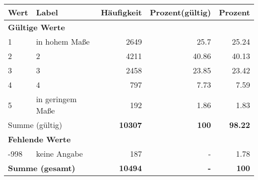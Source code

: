      \begin{longtable}{lXrrr}
     \toprule
     \textbf{Wert} & \textbf{Label} & \textbf{Häufigkeit} & \textbf{Prozent(gültig)} & \textbf{Prozent} \\
     \endhead
     \midrule
     \multicolumn{5}{l}{\textbf{Gültige Werte}}\\

     1 &
     \multicolumn{1}{X}{ in hohem Maße   } &


       \num{2649} &
       \num[round-mode=places,round-precision=2]{25,7} &
         \num[round-mode=places,round-precision=2]{25,24} \\

     2 &
     \multicolumn{1}{X}{ 2   } &


       \num{4211} &
       \num[round-mode=places,round-precision=2]{40,86} &
         \num[round-mode=places,round-precision=2]{40,13} \\

     3 &
     \multicolumn{1}{X}{ 3   } &


       \num{2458} &
       \num[round-mode=places,round-precision=2]{23,85} &
         \num[round-mode=places,round-precision=2]{23,42} \\

     4 &
     \multicolumn{1}{X}{ 4   } &


       \num{797} &
       \num[round-mode=places,round-precision=2]{7,73} &
         \num[round-mode=places,round-precision=2]{7,59} \\

     5 &
     \multicolumn{1}{X}{ in geringem Maße   } &


       \num{192} &
       \num[round-mode=places,round-precision=2]{1,86} &
         \num[round-mode=places,round-precision=2]{1,83} \\
     \midrule
     \multicolumn{2}{l}{Summe (gültig)} &
       \textbf{\num{10307}} &
     \textbf{100} &
       \textbf{\num[round-mode=places,round-precision=2]{98,22}} \\
     \multicolumn{5}{l}{\textbf{Fehlende Werte}}\\
       -998 &
       keine Angabe &
         \num{187} &
        - &
         \num[round-mode=places,round-precision=2]{1,78} \\
     \midrule
     \multicolumn{2}{l}{\textbf{Summe (gesamt)}} &
          \textbf{\num{10494}} &
        \textbf{-} &
        \textbf{100} \\
     \bottomrule
     \end{longtable}
     
